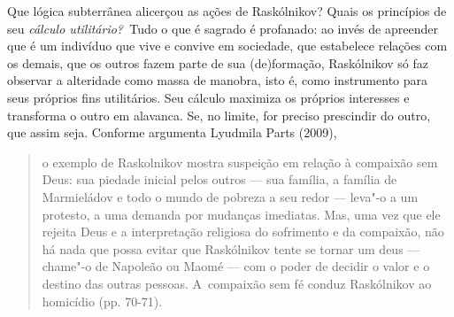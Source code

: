 Que lógica subterrânea alicerçou as ações de Raskólnikov? Quais os
princípios de seu \emph{cálculo utilitário?~}Tudo o que é sagrado é
profanado: ao invés de apreender que é um indivíduo que vive e convive
em sociedade, que estabelece relações com os demais, que os outros fazem
parte de sua (de)formação, Raskólnikov só faz observar a alteridade como
massa de manobra, isto é, como instrumento para seus próprios fins
utilitários. Seu cálculo maximiza os próprios interesses e transforma o
outro em alavanca. Se, no limite, for preciso prescindir do outro, que
assim seja. Conforme argumenta Lyudmila Parts (2009),

\begin{quote}
o exemplo de Raskolnikov mostra suspeição em relação à compaixão sem
Deus: sua piedade inicial pelos outros --- sua família, a família de
Marmieládov e todo o mundo de pobreza a seu redor --- leva"-o a um
protesto, a uma demanda por mudanças imediatas. Mas, uma vez que ele
rejeita Deus e a interpretação religiosa do sofrimento e da compaixão,
não há nada que possa evitar que Raskólnikov tente se tornar um deus ---
chame"-o de Napoleão ou Maomé --- com o poder de decidir o valor e o
destino das outras pessoas. A~compaixão sem fé conduz Raskólnikov ao
homicídio (pp. 70-71).
\end{quote}

